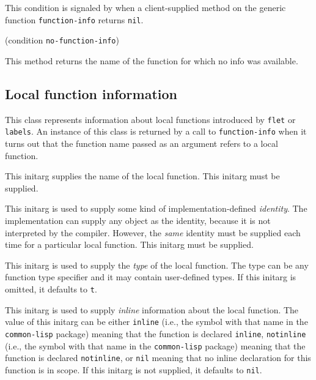 
This condition is signaled by \sysname{} when a client-supplied method
on the generic function \texttt{function-info} returns \texttt{nil}.

 {(condition {\tt no-function-info})}

This method returns the name of the function for which no info was
available. 

\subsection{Local function information}


This class represents information about local functions introduced by
\texttt{flet} or \texttt{labels}.  An instance of this class is
returned by a call to \texttt{function-info} when it turns out that
the function name passed as an argument refers to a local function. 


This initarg supplies the name of the local function.  This initarg
must be supplied.


This initarg is used to supply some kind of implementation-defined 
\emph{identity}.  The implementation can supply any object as the
identity, because it is not interpreted by the compiler.  However, the
\emph{same} identity must be supplied each time for a particular
local function.  This initarg must be supplied. 


This initarg is used to supply the \emph{type} of the local function.
The type can be any function type specifier and it may contain
user-defined types.  If this initarg is omitted, it defaults to
\texttt{t}.


This initarg is used to supply \emph{inline} information about the
local function.  The value of this initarg can be either
\texttt{inline} (i.e., the symbol with that name in the
\texttt{common-lisp} package) meaning that the function is declared
\texttt{inline}, \texttt{notinline} (i.e., the symbol with that name
in the \texttt{common-lisp} package) meaning that the function is
declared \texttt{notinline}, or \texttt{nil} meaning that no inline
declaration for this function is in scope.  If this initarg is not
supplied, it defaults to \texttt{nil}.

